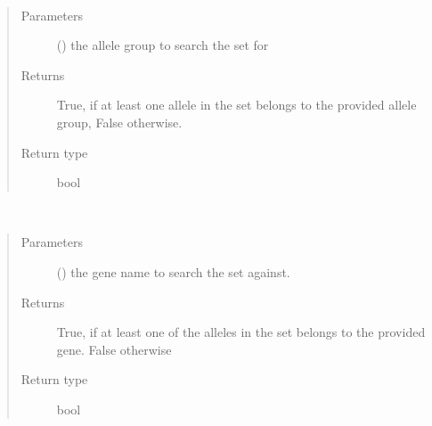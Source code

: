 \documentclass[letterpaper,10pt,english]{sphinxmanual}
\begin{document}
\begin{fulllineitems}
\begin{fulllineitems}
\label{\detokenize{IPTK.Classes:IPTK.Classes.HLASet.HLASet.has_allele_group}}~\begin{quote}\begin{description}
\item[{Parameters}] \leavevmode
{} () \textendash{} the allele group to search the set for

\item[{Returns}] \leavevmode
True, if at least one allele in the set belongs to the provided allele group, False otherwise.

\item[{Return type}] \leavevmode
bool

\end{description}\end{quote}

\end{fulllineitems}


\begin{fulllineitems}
\label{\detokenize{IPTK.Classes:IPTK.Classes.HLASet.HLASet.has_gene}}~\begin{quote}\begin{description}
\item[{Parameters}] \leavevmode
{} () \textendash{} the gene name to search the set against.

\item[{Returns}] \leavevmode
True, if at least one of the alleles in the set belongs to the provided gene. False otherwise

\item[{Return type}] \leavevmode
bool

\end{description}\end{quote}

\end{fulllineitems}


\end{fulllineitems}
\end{document}
